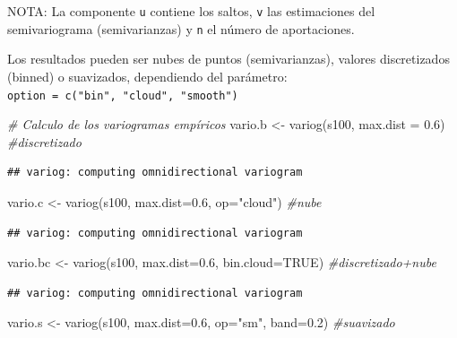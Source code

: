 \documentclass[
  spanish,
]{book}
\newenvironment{Shaded}{\begin{snugshade}}{\end{snugshade}}
\newcommand{\AttributeTok}[1]{\textcolor[rgb]{0.77,0.63,0.00}{#1}}
\newcommand{\CommentTok}[1]{\textcolor[rgb]{0.56,0.35,0.01}{\textit{#1}}}
\newcommand{\ConstantTok}[1]{\textcolor[rgb]{0.00,0.00,0.00}{#1}}
\newcommand{\FloatTok}[1]{\textcolor[rgb]{0.00,0.00,0.81}{#1}}
\newcommand{\FunctionTok}[1]{\textcolor[rgb]{0.00,0.00,0.00}{#1}}
\newcommand{\NormalTok}[1]{#1}
\newcommand{\OtherTok}[1]{\textcolor[rgb]{0.56,0.35,0.01}{#1}}
\newcommand{\StringTok}[1]{\textcolor[rgb]{0.31,0.60,0.02}{#1}}
\theoremstyle{break}
\begin{document}
NOTA: La componente \texttt{u} contiene los saltos, \texttt{v} las estimaciones del
semivariograma (semivarianzas) y \texttt{n} el número de aportaciones.

Los resultados pueden ser nubes de puntos (semivarianzas), valores
discretizados (binned) o suavizados, dependiendo del parámetro:
\texttt{option\ =\ c("bin",\ "cloud",\ "smooth")}

\begin{Shaded}
\begin{Highlighting}[]
\CommentTok{\# Calculo de los variogramas empíricos}
\NormalTok{vario.b }\OtherTok{\textless{}{-}} \FunctionTok{variog}\NormalTok{(s100, }\AttributeTok{max.dist =} \FloatTok{0.6}\NormalTok{) }\CommentTok{\#discretizado}
\end{Highlighting}
\end{Shaded}

\begin{verbatim}
## variog: computing omnidirectional variogram
\end{verbatim}

\begin{Shaded}
\begin{Highlighting}[]
\NormalTok{vario.c }\OtherTok{\textless{}{-}} \FunctionTok{variog}\NormalTok{(s100, }\AttributeTok{max.dist=}\FloatTok{0.6}\NormalTok{, }\AttributeTok{op=}\StringTok{"cloud"}\NormalTok{)  }\CommentTok{\#nube}
\end{Highlighting}
\end{Shaded}

\begin{verbatim}
## variog: computing omnidirectional variogram
\end{verbatim}

\begin{Shaded}
\begin{Highlighting}[]
\NormalTok{vario.bc }\OtherTok{\textless{}{-}} \FunctionTok{variog}\NormalTok{(s100, }\AttributeTok{max.dist=}\FloatTok{0.6}\NormalTok{, }\AttributeTok{bin.cloud=}\ConstantTok{TRUE}\NormalTok{)  }\CommentTok{\#discretizado+nube}
\end{Highlighting}
\end{Shaded}

\begin{verbatim}
## variog: computing omnidirectional variogram
\end{verbatim}

\begin{Shaded}
\begin{Highlighting}[]
\NormalTok{vario.s }\OtherTok{\textless{}{-}} \FunctionTok{variog}\NormalTok{(s100, }\AttributeTok{max.dist=}\FloatTok{0.6}\NormalTok{, }\AttributeTok{op=}\StringTok{"sm"}\NormalTok{, }\AttributeTok{band=}\FloatTok{0.2}\NormalTok{)  }\CommentTok{\#suavizado}
\end{Highlighting}
\end{Shaded}
\end{document}
